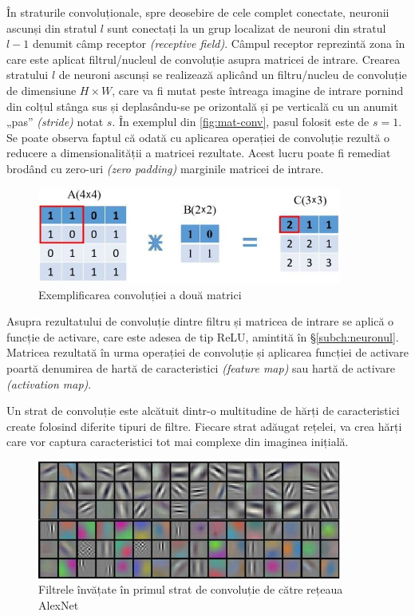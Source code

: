 În straturile convoluționale, spre deosebire de cele complet conectate, neuronii ascunși din stratul $l$ sunt conectați la un grup localizat de neuroni din stratul $l-1$ denumit câmp receptor \textit{(receptive field)}. Câmpul receptor reprezintă zona în care este aplicat filtrul/nucleul de convoluție asupra matricei de intrare. Crearea stratului $l$ de neuroni ascunși se realizează aplicând un filtru/nucleu de convoluție de dimensiune $H\times W$, care va fi mutat peste întreaga imagine de intrare pornind din colțul stânga sus și deplasându-se pe orizontală și pe verticală cu un anumit „pas” \textit{(stride)} notat $s$. În exemplul din \autoref{fig:mat-conv}, pasul folosit este de $s=1$. Se poate observa faptul că odată cu aplicarea operației de convoluție rezultă o reducere a dimensionalității a matricei rezultate. Acest lucru poate fi remediat brodând cu zero-uri \textit{(zero padding)} marginile matricei de intrare.
\begin{figure}[ht]
\centering
\includegraphics[width=10cm, keepaspectratio]{fig/cap2/conv-op.jpg}
\caption{Exemplificarea convoluției a două matrici \cite{vrejoiu:2019}}
\label{fig:mat-conv}
\end{figure}

Asupra rezultatului de convoluție dintre filtru și matricea de intrare se aplică o funcție de activare, care este adesea de tip ReLU, amintită în \S\ref{subch:neuronul}. Matricea rezultată în urma operației de convoluție și aplicarea funcției de activare poartă denumirea de hartă de caracteristici \textit{(feature map)} sau hartă de activare \textit{(activation map)}.

Un strat de convoluție este alcătuit dintr-o multitudine de hărți de caracteristici create folosind diferite tipuri de filtre. Fiecare strat adăugat rețelei, va crea hărți care vor captura caracteristici tot mai complexe din imaginea inițială.
\begin{figure}[ht]
\centering
\includegraphics[width=10cm, keepaspectratio]{fig/cap2/alexnet-filters.jpg}
\caption{Filtrele învățate în primul strat de convoluție de către rețeaua AlexNet \cite{alexnet:2012}}
\label{fig:alexnet-filters}
\end{figure}

